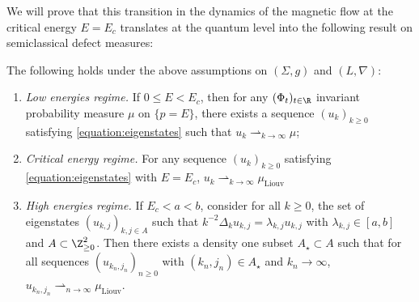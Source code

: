 We will prove that this transition in the dynamics of the magnetic flow at the critical energy $E=E_c$ translates at the quantum level into the following result on semiclassical defect measures:

\begin{theorem}
\label{theorem:main}
The following holds under the above assumptions on $(\Sigma,g)$ and $(L,\nabla)$:
\begin{enumerate}

\item\label{theorem:maini} \emph{Low energies regime.} If $0 \leq E < E_c$, then for any $(\Phi_t)_{t \in \R}$ invariant probability measure $\mu$ on $\{p=E\}$, there exists a sequence $(u_{k})_{k \geq 0}$ satisfying \eqref{equation:eigenstates} such that $u_{k} \rightharpoonup_{k \to \infty} \mu$;

\item\label{theorem:mainii} \emph{Critical energy regime.} For any
sequence $(u_k)_{k \geq 0}$ satisfying \eqref{equation:eigenstates} with $E=E_c$, $u_{k} \rightharpoonup_{k \to \infty} \mu_{\mathrm{Liouv}}$

\item\label{theorem:mainiii} \emph{High energies regime.} If $E_c < a < b$, consider for
all $k \geq 0$, the set of eigenstates $(u_{k,j})_{k,j \in A}$ such that
$k^{-2} \Delta_k u_{k,j} = \lambda_{k,j} u_{k,j}$ with $\lambda_{k,j} \in
[a,b]$ and $A \subset \Z_{\geq 0}^2$. Then there exists a density one subset
$A_\star \subset A$ such that for all sequences $(u_{k_n,j_n})_{n \geq 0}$
with $(k_n,j_n) \in A_\star$ and $k_n \to \infty$, $u_{k_n,j_n} \rightharpoonup_{n \to \infty} \mu_{\mathrm{Liouv}}$.
\end{enumerate}
\end{theorem}
